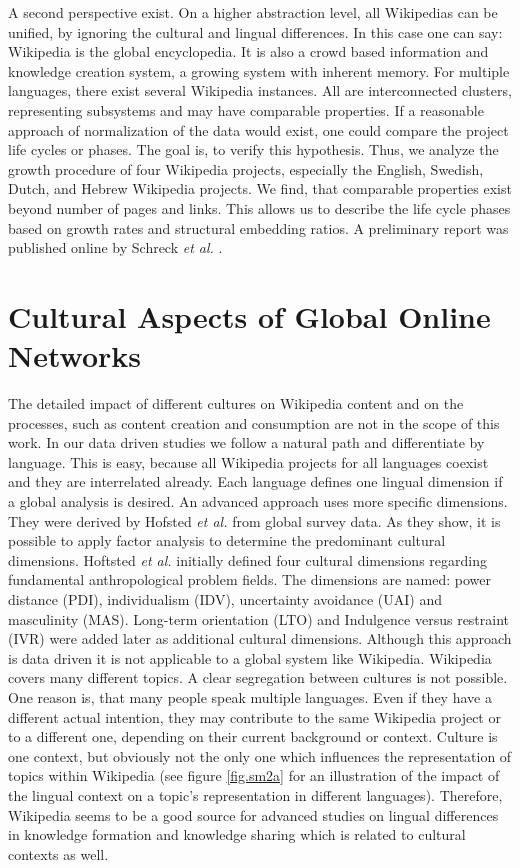 \documentclass[a4paper,10pt]{scrbook}
\begin{document}
A second perspective exist. On a higher abstraction level, all Wikipedias can be unified, by ignoring the cultural and lingual differences. In this case one can say: Wikipedia is the global encyclopedia. It is also a crowd based information and knowledge creation system, a growing system with inherent memory. For multiple languages, there exist several Wikipedia instances. All are interconnected clusters, representing subsystems and may have comparable properties. If a reasonable approach of normalization of the data would exist, one could compare the project life cycles or phases. The goal is, to verify this hypothesis. Thus, we analyze the growth procedure of four Wikipedia projects, especially the English, Swedish, Dutch, and Hebrew Wikipedia projects. We find, that comparable properties exist beyond number of pages and links. This allows us to describe the life cycle phases based on growth rates and structural embedding ratios. A preliminary report was published online by Schreck \textit{et al.} \cite{Schreck2013}. 


\section{Cultural Aspects of Global Online Networks }
The detailed impact of different cultures on Wikipedia content and on the processes, such as content creation and consumption are not in the scope of this work. In our data driven studies we follow a natural path and differentiate by language. This is easy, because all Wikipedia projects for all languages coexist and they are interrelated already. Each language defines one lingual dimension if a global analysis is desired. 
An advanced approach uses more specific dimensions. They were derived by Hofsted \textit{et al.} \cite{Hofsted1984} from global survey data. As they show, it is possible to apply factor analysis to determine the predominant cultural dimensions. Hoftsted \textit{et al.} initially defined four cultural dimensions regarding fundamental anthropological problem fields. The dimensions are named: power distance (PDI), individualism (IDV), uncertainty avoidance (UAI) and masculinity (MAS). Long-term orientation (LTO) and Indulgence versus restraint (IVR) were added later as additional cultural dimensions. Although this approach is data driven it is not applicable to a global system like Wikipedia. Wikipedia covers many different topics. A clear segregation between cultures is not possible. One reason is, that many people speak multiple languages. Even if they have a different actual intention, they may contribute to the same Wikipedia project or to a different one, depending on their current background or context. Culture is one context, but obviously not the only one which influences the representation of topics within Wikipedia (see figure \ref{fig.sm2a} for an illustration of the impact of the lingual context on a topic's representation in different languages). Therefore, Wikipedia seems to be a good source for advanced studies on lingual  differences in knowledge formation and knowledge sharing which is related to cultural contexts as well.   
\end{document}
